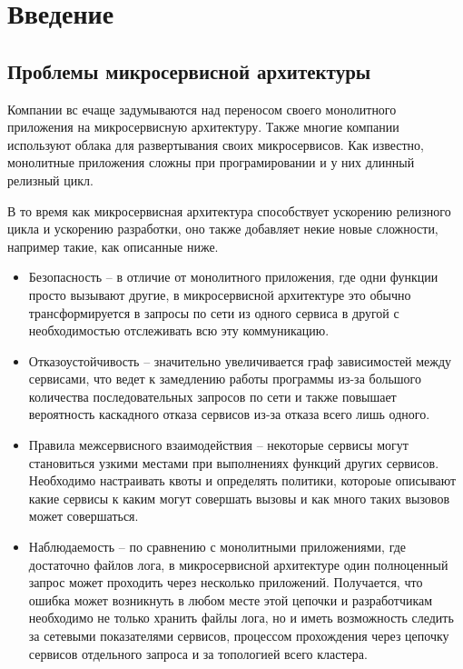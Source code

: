 
\section{Введение}
\label{sec:intro}
\subsection{Проблемы микросервисной архитектуры}
Компании вс ечаще задумываются над переносом своего монолитного приложения на микросервисную архитектуру. Также многие компании используют облака для развертывания своих микросервисов. Как известно, монолитные приложения сложны при програмировании и у них длинный релизный цикл.

В то время как микросервисная архитектура способствует ускорению релизного цикла и ускорению разработки, оно также добавляет некие новые сложности, например такие, как описанные ниже.
\begin{itemize}
	\item Безопасность -- в отличие от монолитного приложения, где одни функции просто вызывают другие, в микросервисной архитектуре это обычно трансформируется в запросы по сети из одного сервиса в другой с необходимостью отслеживать всю эту коммуникацию.
	\item Отказоустойчивость -- значительно увеличивается граф зависимостей между сервисами, что ведет к замедлению работы программы из-за большого количества последовательных запросов по сети и также повышает вероятность каскадного отказа сервисов из-за отказа всего лишь одного.
	\item Правила межсервисного взаимодействия -- некоторые сервисы могут становиться узкими местами при выполнениях функций других сервисов. Необходимо настраивать квоты и определять политики, котороые описывают какие сервисы к каким могут совершать вызовы и как много таких вызовов может совершаться.
	\item Наблюдаемость -- по сравнению с монолитными приложениями, где достаточно файлов лога, в микросервисной архитектуре один полноценный запрос может проходить через несколько приложений. Получается, что ошибка может возникнуть в любом месте этой цепочки и разработчикам необходимо не только хранить файлы лога, но и иметь возможность следить за сетевыми показателями сервисов, процессом прохождения через цепочку сервисов отдельного запроса и за топологией всего кластера.
\end{itemize}

